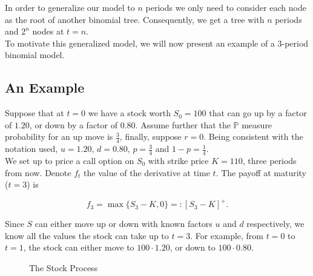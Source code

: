 \documentclass[../TGMAFFIRO.tex]{subfiles}
\begin{document}
In order to generalize our model to $n$ periods we only need to consider each node as the root of another binomial tree. Consequently, we get a tree with $n$ periods and $2^n$ nodes at $t=n$.\\

To motivate this generalized model, we will now present an example of a $3$-period binomial model.
\subsection{An Example}
Suppose that at $t=0$ we have a stock worth $S_0=100$ that can go up by a factor of $1.20$, or down by a factor of $0.80$. Assume further that the $\mathbb{P}$ measure probability for an up move is $\frac{3}{4}$, finally, suppose $r=0$. Being consistent with the notation used, $u=1.20$, $d=0.80$, $p = \frac{3}{4}$ and $ 1 - p = \frac{1}{4}$.\\

We set up to price a call option on $S_0$ with strike price $K=110$, three periods from now. Denote $f_t$ the value of the derivative at time $t$. The payoff at maturity ($t=3$) is

\begin{equation}
    f_3 = \max\{S_3 - K, 0\} =: [S_3 - K]^+.
\end{equation}

Since $S$ can either move up or down with known factors $u$ and $d$ respectively, we know all the values the stock can take up to $t=3$. For example, from $t=0$ to $t=1$, the stock can either move to $100 \cdot 1.20$, or down to $100 \cdot 0.80$.\\

\begin{figure}[h]
\centering
{}
\caption{The Stock Process}
\end{figure}
\end{document}
